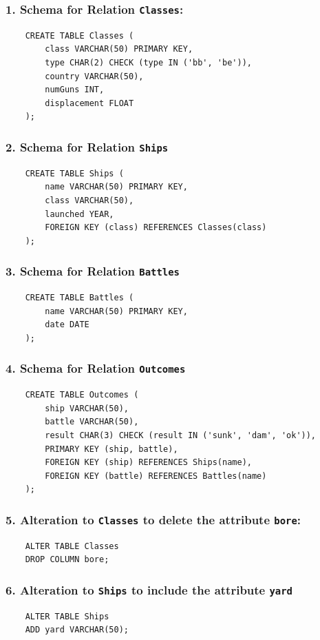 \documentclass{cshwk}
\begin{document}
\subsubsection*{1. Schema for Relation \texttt{Classes}:}
\begin{verbatim}
    CREATE TABLE Classes (
        class VARCHAR(50) PRIMARY KEY,
        type CHAR(2) CHECK (type IN ('bb', 'be')),
        country VARCHAR(50),
        numGuns INT,
        displacement FLOAT
    );    
\end{verbatim}

\subsubsection*{2. Schema for Relation \texttt{Ships}}
\begin{verbatim}
    CREATE TABLE Ships (
        name VARCHAR(50) PRIMARY KEY,
        class VARCHAR(50),
        launched YEAR,
        FOREIGN KEY (class) REFERENCES Classes(class)
    );    
\end{verbatim}


\subsubsection*{3. Schema for Relation \texttt{Battles}}
\begin{verbatim}
    CREATE TABLE Battles (
        name VARCHAR(50) PRIMARY KEY,
        date DATE
    );    
\end{verbatim}

\subsubsection*{4. Schema for Relation \texttt{Outcomes}}

\begin{verbatim}
    CREATE TABLE Outcomes (
        ship VARCHAR(50),
        battle VARCHAR(50),
        result CHAR(3) CHECK (result IN ('sunk', 'dam', 'ok')),
        PRIMARY KEY (ship, battle),
        FOREIGN KEY (ship) REFERENCES Ships(name),
        FOREIGN KEY (battle) REFERENCES Battles(name)
    );    
\end{verbatim}

\subsubsection*{5. Alteration to \texttt{Classes} to delete the attribute \texttt{bore}:}

\begin{verbatim}
    ALTER TABLE Classes
    DROP COLUMN bore;    
\end{verbatim}

\subsubsection*{6. Alteration to \texttt{Ships} to include the attribute \texttt{yard}}

\begin{verbatim}
    ALTER TABLE Ships
    ADD yard VARCHAR(50);    
\end{verbatim}
\end{document}
